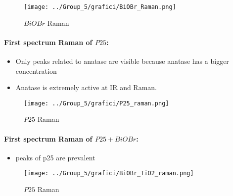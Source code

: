 \begin{figure}[ht]
    \centering
    \texttt{[image: ../Group\_5/grafici/BiOBr\_Raman.png]}
    \caption{$BiOBr$ Raman}
\end{figure}


\newpage
\paragraph{First spectrum Raman of $P25$:}

\begin{itemize}
    \item Only peaks related to anatase are visible because anatase has a bigger concentration
    \item Anatase is extremely active at IR and Raman.
\end{itemize}

\begin{figure}[ht]
    \centering
    \texttt{[image: ../Group\_5/grafici/P25\_raman.png]}
    \caption{$P25$ Raman}
\end{figure}


\newpage
\paragraph{First spectrum Raman of $P25+BiOBr$:}

\begin{itemize}
    \item peaks of p25 are prevalent
\end{itemize}

\begin{figure}[ht]
    \centering
    \texttt{[image: ../Group\_5/grafici/BiOBr\_TiO2\_raman.png]}
    \caption{$P25$ Raman}
\end{figure}

